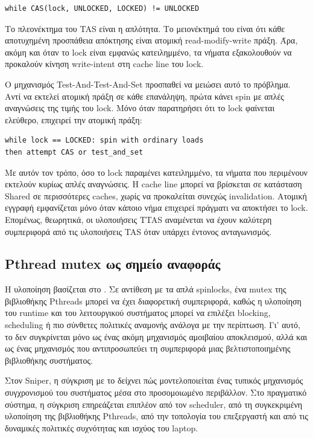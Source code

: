 \documentclass{article}
\newcommand{\code}[1]{\texttt{\detokenize{#1}}}
\providecommand{\textenglish}[1]{\foreignlanguage{english}{#1}}
\begin{document}
\begin{verbatim}
while CAS(lock, UNLOCKED, LOCKED) != UNLOCKED
\end{verbatim}

Το πλεονέκτημα του TAS είναι η απλότητα. Το μειονέκτημά του είναι ότι κάθε αποτυχημένη προσπάθεια απόκτησης είναι ατομική read-modify-write πράξη. Άρα, ακόμη και όταν το lock είναι εμφανώς κατειλημμένο, τα νήματα εξακολουθούν να προκαλούν κίνηση write-intent στη cache line του lock.

Ο μηχανισμός \textenglish{Test-And-Test-And-Set} προσπαθεί να μειώσει αυτό το πρόβλημα. Αντί να εκτελεί ατομική πράξη σε κάθε επανάληψη, πρώτα κάνει spin με απλές αναγνώσεις της τιμής του lock. Μόνο όταν παρατηρήσει ότι το lock φαίνεται ελεύθερο, επιχειρεί την ατομική πράξη:

\begin{verbatim}
while lock == LOCKED: spin with ordinary loads
then attempt CAS or test_and_set
\end{verbatim}

Με αυτόν τον τρόπο, όσο το lock παραμένει κατειλημμένο, τα νήματα που περιμένουν εκτελούν κυρίως απλές αναγνώσεις. Η cache line μπορεί να βρίσκεται σε κατάσταση Shared σε περισσότερες caches, χωρίς να προκαλείται συνεχώς invalidation. Ατομική εγγραφή εμφανίζεται μόνο όταν κάποιο νήμα επιχειρεί πράγματι να αποκτήσει το lock. Επομένως, θεωρητικά, οι υλοποιήσεις TTAS αναμένεται να έχουν καλύτερη συμπεριφορά από τις υλοποιήσεις TAS όταν υπάρχει έντονος ανταγωνισμός.

\subsection{Pthread mutex ως σημείο αναφοράς}

Η υλοποίηση \code{MUTEX} βασίζεται στο \code{pthread_mutex_t}. Σε αντίθεση με τα απλά spinlocks, ένα mutex της βιβλιοθήκης Pthreads μπορεί να έχει διαφορετική συμπεριφορά, καθώς η υλοποίηση του runtime και του λειτουργικού συστήματος μπορεί να επιλέξει blocking, scheduling ή πιο σύνθετες πολιτικές αναμονής ανάλογα με την περίπτωση. Γι' αυτό, το \code{MUTEX} δεν συγκρίνεται μόνο ως ένας ακόμη μηχανισμός αμοιβαίου αποκλεισμού, αλλά και ως ένας μηχανισμός που αντιπροσωπεύει τη συμπεριφορά μιας βελτιστοποιημένης βιβλιοθήκης συστήματος.

Στον Sniper, η σύγκριση με το \code{MUTEX} δείχνει πώς μοντελοποιείται ένας τυπικός μηχανισμός συγχρονισμού του συστήματος μέσα στο προσομοιωμένο περιβάλλον. Στο πραγματικό σύστημα, η σύγκριση επηρεάζεται επιπλέον από τον scheduler, από τη συγκεκριμένη υλοποίηση της βιβλιοθήκης Pthreads, από την τοπολογία του επεξεργαστή και από τις δυναμικές πολιτικές συχνότητας και ισχύος του laptop.
\end{document}
